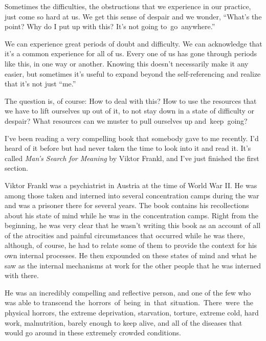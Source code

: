Sometimes the difficulties, the obstructions that we experience in our practice, just come so hard at us. We get this sense of despair and we wonder, ``What's the point? Why do I put up with this? It's not going \mbox{to go anywhere.''}

We can experience great periods of doubt and difficulty. We can acknowledge that it's a common experience for all of us. Every one of us has gone through periods like this, in one way or another. Knowing this doesn't necessarily make it any easier, but sometimes it's useful to expand beyond the self-referencing and realize that it's not just ``me.''

The question is, of course: How to deal with this? How to use the resources that we have to lift ourselves up out of it, to not stay down in a state of difficulty or despair? What resources can we muster to pull ourselves up \mbox{and keep going?}

I've been reading a very compelling book that somebody gave to me recently. I'd heard of it before but had never taken the time to look into it and read it. It's called \emph{Man's Search for Meaning} by Viktor Frankl, and I've just finished \linebreak the first section.

Viktor Frankl was a psychiatrist in Austria at the time of World War II. He was among those taken and interned into several concentration camps during the war and was a prisoner there for several years. The book contains his recollections about his state of mind while he was in the concentration camps. Right from the beginning, he was very clear that he wasn't writing this book as an account of all of the atrocities and painful circumstances that occurred while he was there, although, of course, he had to relate some of them to provide the context for his own internal processes. He then expounded on these states of mind and what he saw as the internal mechanisms at work for the other people that he was interned with there.

He was an incredibly compelling and reflective person, and one of the few who was able to transcend \mbox{the horrors of being in that situation. There were the} physical horrors, the extreme deprivation, starvation, torture, extreme cold, hard work, malnutrition, barely enough to keep alive, and all of the diseases that would go around in these extremely crowded conditions.

